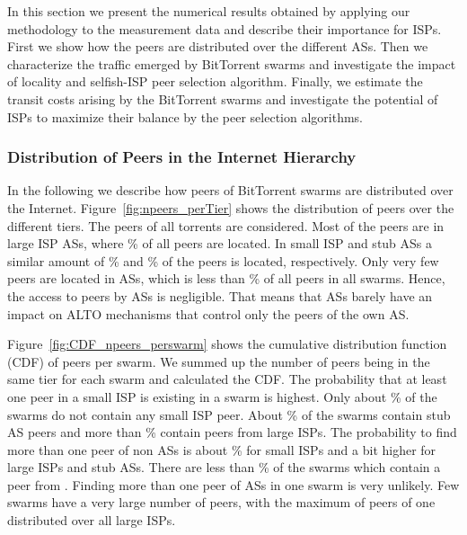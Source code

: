 In this section we present the numerical results obtained by applying our methodology to the measurement data and describe their importance for ISPs. First we show how the peers are distributed over the different ASs. Then we characterize the traffic emerged by BitTorrent swarms and investigate the impact of locality and selfish-ISP peer selection algorithm. Finally, we estimate the transit costs arising by the BitTorrent swarms and investigate the potential of ISPs to maximize their balance by the peer selection algorithms.

\subsubsection{Distribution of Peers in the Internet Hierarchy}

In the following we describe how peers of BitTorrent swarms are distributed over the Internet.
Figure~\ref{fig:npeers_perTier} shows the distribution of peers over the different tiers. The peers of all torrents are considered. Most of the peers are in large ISP ASs, where \unit[40]{\%} of all peers are located. In small ISP and stub ASs a similar amount of \unit[29]{\%} and \unit[31]{\%} of the peers is located, respectively. Only very few peers are located in \tier ASs, which is less than \unit[1]{\%} of all peers in all swarms. Hence, the access to peers by \tier ASs is negligible. That means that \tier ASs barely have an impact on ALTO mechanisms that control only the peers of the own AS.

Figure~\ref{fig:CDF_npeers_perswarm} shows the cumulative distribution function (CDF) of peers per swarm. We summed up the number of peers being in the same tier for each swarm and calculated the CDF. The probability that at least one peer in a small ISP is existing in a swarm is highest. Only about \unit[2]{\%} of the swarms do not contain any small ISP peer. About \unit[57]{\%} of the swarms contain stub AS peers and more than \unit[60]{\%} contain peers from large ISPs. The probability to find more than one peer of non \tier ASs is about \unit[45]{\%} for small ISPs and a bit higher for large ISPs and stub ASs. There are less than \unit[10]{\%} of the swarms which contain a peer from \tier. Finding more than one peer of \tier ASs in one swarm is very unlikely. Few swarms have a very large number of peers, with the maximum of  peers of one distributed over all large ISPs.


